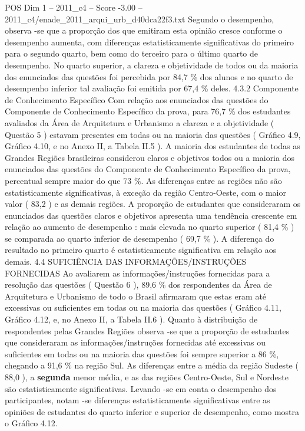 \begin{textsample}{POS Dim 1 – 2011\_c4 – Score -3.00 – 2011\_c4/enade\_2011\_arqui\_urb\_d40dca22f3.txt}
Segundo o desempenho, observa -se que a proporção dos que emitiram esta opinião cresce conforme o desempenho aumenta, com diferenças estatisticamente significativas do primeiro para o segundo quarto, bem como do terceiro para o último quarto de desempenho.
No quarto superior, a clareza e objetividade de todos ou da maioria dos enunciados das questões foi percebida por 84,7 \% dos alunos e no quarto de desempenho inferior tal avaliação foi emitida por 67,4 \% deles. 4.3.2 Componente de Conhecimento Específico Com relação aos enunciados das questões do Componente de Conhecimento Específico da prova, para 76,7 \% dos estudantes avaliados da Área de Arquitetura e Urbanismo a clareza e a objetividade ( Questão 5 ) estavam presentes em todas ou na maioria das questões ( Gráfico 4.9, Gráfico 4.10, e no Anexo II, a Tabela II.5 ).
A maioria dos estudantes de todas as Grandes Regiões brasileiras considerou claros e objetivos todos ou a maioria dos enunciados das questões do Componente de Conhecimento Específico da prova, percentual sempre maior do que 73 \%.
As diferenças entre as regiões não são estatisticamente significativas, à exceção da região Centro-Oeste, com o maior valor ( 83,2 ) e as demais regiões.
A proporção de estudantes que consideraram os enunciados das questões claros e objetivos apresenta uma tendência crescente em relação ao aumento de desempenho : mais elevada no quarto superior ( 81,4 \% ) se comparada ao quarto inferior de desempenho ( 69,7 \% ).
A diferença do resultado no primeiro quarto é estatisticamente significativa em relação aos demais. 4.4 SUFICIÊNCIA DAS INFORMAÇÕES/INSTRUÇÕES FORNECIDAS Ao avaliarem as informações/instruções fornecidas para a resolução das questões ( Questão 6 ), 89,6 \% dos respondentes da Área de Arquitetura e Urbanismo de todo o Brasil afirmaram que estas eram até excessivas ou suficientes em todas ou na maioria das questões ( Gráfico 4.11, Gráfico 4.12, e, no Anexo II, a Tabela II.6 ).
Quanto à distribuição de respondentes pelas Grandes Regiões observa -se que a proporção de estudantes que consideraram as informações/instruções fornecidas até excessivas ou suficientes em todas ou na maioria das questões foi sempre superior a 86 \%, chegando a 91,6 \% na região Sul.
As diferenças entre a média da região Sudeste ( 88,0 ), a \textbf{segunda} menor média, e as das regiões Centro-Oeste, Sul e Nordeste são estatisticamente significativas.
Levando -se em conta o desempenho dos participantes, notam -se diferenças estatisticamente significativas entre as opiniões de estudantes do quarto inferior e superior de desempenho, como mostra o Gráfico 4.12.

\end{textsample}
